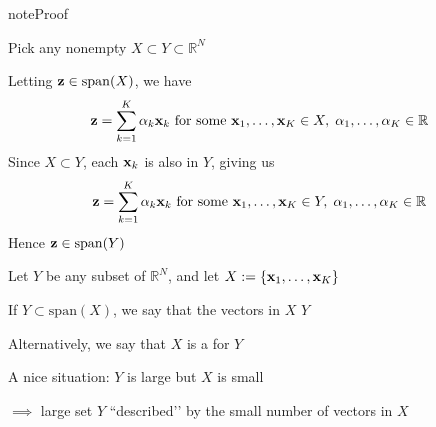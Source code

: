 \documentclass[letterpaper,10pt,english]{jupyterBook}
\begin{document}
\begin{sphinxadmonition}{note}{Proof}

\sphinxAtStartPar
Pick any nonempty \(X \subset Y \subset \mathbb{R}^N\)

\sphinxAtStartPar
Letting \({\bf z} \in \mathrm{span}(X)\), we have
\begin{equation*}
\begin{split}
%
{\bf z} = \sum_{k=1}^K \alpha_k {\bf x}_k 
\text{ for some }
{\bf x}_1, \ldots, {\bf x}_K \in X, \; 
\alpha_1, \ldots, \alpha_K \in \mathbb{R}
%
\end{split}
\end{equation*}
\sphinxAtStartPar
Since \(X \subset Y\), each \({\bf x}_k\) is also in \(Y\), giving us
\begin{equation*}
\begin{split}
%
{\bf z} = \sum_{k=1}^K \alpha_k {\bf x}_k 
\text{ for some }
{\bf x}_1, \ldots, {\bf x}_K \in Y, \; 
\alpha_1, \ldots, \alpha_K \in \mathbb{R}
%
\end{split}
\end{equation*}
\sphinxAtStartPar
Hence \({\bf z} \in \mathrm{span}(Y)\)
\end{sphinxadmonition}

\sphinxAtStartPar
Let \(Y\) be any subset of \(\mathbb{R}^N\), and let \(X:= \{{\bf x}_1,\ldots, {\bf x}_K\}\)

\sphinxAtStartPar
If \(Y \subset \mathrm{span}(X)\), we say that the vectors in \(X\)  \(Y\)

\sphinxAtStartPar
Alternatively, we say that \(X\) is a  for \(Y\)

\sphinxAtStartPar
A nice situation: \(Y\) is large but \(X\) is small

\sphinxAtStartPar
\(\implies\) large set \(Y\) ``described’’ by the small number of vectors in \(X\)
\end{document}
